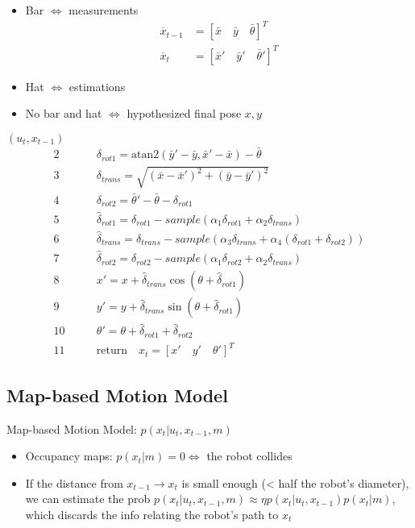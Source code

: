\note
\begin{itemize}
	\item Bar $\Leftrightarrow$ measurements
	\begin{align*}
		\overline{x}_{t-1} &= [\bar{x} \quad \bar{y} \quad \bar{\theta}]^T\\
		\overline{x}_t &= [\bar{x}' \quad \bar{y}' \quad \bar{\theta}']^T
	\end{align*}
	\item Hat $\Leftrightarrow$ estimations
	\item No bar and hat $\Leftrightarrow$ hypothesized final pose $x, y$
\end{itemize}

 $(u_t, x_{t-1})$
\begin{align*}
	2 \qquad & \delta_{rot1} = \text{atan2}(\bar{y}'-\bar{y}, \bar{x}'-\bar{x}) - \bar{\theta} \\
	3 \qquad & \delta_{trans} = \sqrt{(\bar{x}-\bar{x}')^2 + (\bar{y}-\bar{y}')^2} \\
	4 \qquad & \delta_{rot2} = \bar{\theta}' - \bar{\theta} - \delta_{rot1} \\
	5 \qquad & \hat{\delta}_{rot1} = \delta_{rot1} - sample(\alpha_1\delta_{rot1} + \alpha_2\delta_{trans}) \\
	6 \qquad & \hat{\delta}_{trans} =\delta_{trans} - sample(\alpha_3\delta_{trans} + \alpha_4(\delta_{rot1} + \delta_{rot2}) )\\
	7 \qquad & \hat{\delta}_{rot2} = \delta_{rot2} - sample(\alpha_1\delta_{rot2} + \alpha_2\delta_{trans}) \\
	8 \qquad & x' = x + \hat{\delta}_{trans} \cos(\theta + \hat{\delta}_{rot1})\\
	9 \qquad  & y' = y + \hat{\delta}_{trans} \sin(\theta + \hat{\delta}_{rot1})\\
	10 \qquad  & \theta' = \theta + \hat{\delta}_{rot1} + \hat{\delta}_{rot2} \\
	11 \qquad & \text{return}\quad x_t = [x' \quad y' \quad \theta']^T
\end{align*}

\subsection{Map-based Motion Model}

Map-based Motion Model: $p(x_t | u_t, x_{t-1}, m)$
\begin{itemize}
	\item Occupancy maps: $p(x_t | m) = 0 \Leftrightarrow$ the robot collides
	\item If the distance from $x_{t-1} \rightarrow x_t$ is small enough (< half the robot's diameter), we can estimate the \ac{prob} $p(x_t | u_t, x_{t-1}, m) \approx \eta p(x_t | u_t, x_{t-1})p(x_t | m)$, which discards the info relating the robot's path to $x_t$
\end{itemize}

